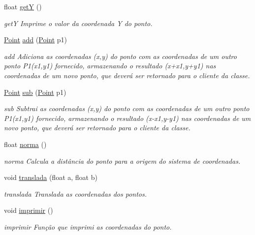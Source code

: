 \begin{DoxyCompactItemize}
float \hyperlink{class_point_a3cccbca94719ddde353cce86ce0e2f64}{getY} ()
\begin{DoxyCompactList}\small\item\em getY Imprime o valor da coordenada Y do ponto. \end{DoxyCompactList}\item 
\hyperlink{class_point}{Point} \hyperlink{class_point_a9dbea84b07b0a8ec3bbb9e58b3d15899}{add} (\hyperlink{class_point}{Point} p1)
\begin{DoxyCompactList}\small\item\em add Adiciona as coordenadas (x,y) do ponto com as coordenadas de um outro ponto P1(x1,y1) fornecido, armazenando o resultado (x+x1,y+y1) nas coordenadas de um novo ponto, que deverá ser retornado para o cliente da classe. \end{DoxyCompactList}\item 
\hyperlink{class_point}{Point} \hyperlink{class_point_a9cf2c53b0a4e6282a6712824bb4e9b00}{sub} (\hyperlink{class_point}{Point} p1)
\begin{DoxyCompactList}\small\item\em sub Subtrai as coordenadas (x,y) do ponto com as coordenadas de um outro ponto P1(x1,y1) fornecido, armazenando o resultado (x-\/x1,y-\/y1) nas coordenadas de um novo ponto, que deverá ser retornado para o cliente da classe. \end{DoxyCompactList}\item 
float \hyperlink{class_point_abd2618d1f505d9392893273a66e7c9b2}{norma} ()
\begin{DoxyCompactList}\small\item\em norma Calcula a distância do ponto para a origem do sistema de coordenadas. \end{DoxyCompactList}\item 
void \hyperlink{class_point_ad9676e36f3444534b609e3c68422239a}{translada} (float a, float b)
\begin{DoxyCompactList}\small\item\em translada Translada as coordenadas dos pontos. \end{DoxyCompactList}\item 
void \hyperlink{class_point_a6c0289d808f65701bc0a28f6f282c85a}{imprimir} ()\hypertarget{class_point_a6c0289d808f65701bc0a28f6f282c85a}{}\label{class_point_a6c0289d808f65701bc0a28f6f282c85a}

\begin{DoxyCompactList}\small\item\em imprimir Função que imprimi as coordenadas do ponto. \end{DoxyCompactList}\end{DoxyCompactItemize}



